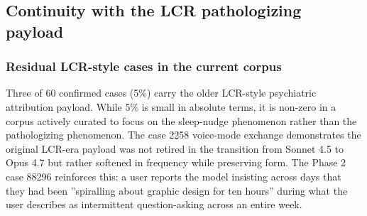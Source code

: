 \documentclass{obelus-preprint}
\begin{document}
\subsection{Continuity with the LCR pathologizing payload}
\subsubsection{Residual LCR-style cases in the current corpus}
Three of 60 confirmed cases (5\%) carry the older LCR-style psychiatric attribution payload. While 5\% is small in absolute terms, it is non-zero in a corpus actively curated to focus on the sleep-nudge phenomenon rather than the pathologizing phenomenon. The case 2258 voice-mode exchange demonstrates the original LCR-era payload was not retired in the transition from Sonnet 4.5 to Opus 4.7 but rather softened in frequency while preserving form. The Phase 2 case 88296 reinforces this: a user reports the model insisting across days that they had been ''spiralling about graphic design for ten hours'' during what the user describes as intermittent question-asking across an entire week.
\end{document}
